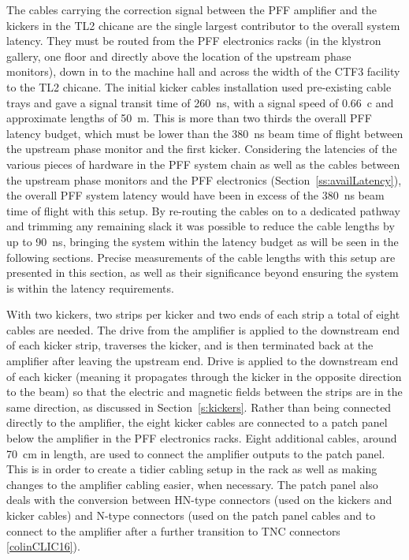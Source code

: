 The cables carrying the correction signal between the PFF amplifier and the kickers in the TL2 chicane are the single largest contributor to the overall system latency. They must be routed from the PFF electronics racks (in the klystron gallery, one floor and directly above the location of the upstream phase monitors), down in to the machine hall and across the width of the CTF3 facility to the TL2 chicane. The initial kicker cables installation used pre-existing cable trays and gave a signal transit time of 260~ns, with a signal speed of 0.66~c and approximate lengths of 50~m. This is more than two thirds the overall PFF latency budget, which must be lower than the 380~ns beam time of flight between the upstream phase monitor and the first kicker. Considering the latencies of the various pieces of hardware in the PFF system chain as well as the cables between the upstream phase monitors and the PFF electronics (Section~\ref{ss:availLatency}), the overall PFF system latency would have been in excess of the \(380\)~ns beam time of flight with this setup. By re-routing the cables on to a dedicated pathway and trimming any remaining slack it was possible to reduce the cable lengths by up to 90~ns, bringing the system within the latency budget as will be seen in the following sections. Precise measurements of the cable lengths with this setup are presented in this section, as well as their significance beyond ensuring the system is within the latency requirements.

With two kickers, two strips per kicker and two ends of each strip a total of eight cables are needed. The drive from the amplifier is applied to the downstream end of each kicker strip, traverses the kicker, and is then terminated back at the amplifier after leaving the upstream end. Drive is applied to the downstream end of each kicker (meaning it propagates through the kicker in the opposite direction to the beam) so that the electric and magnetic fields between the strips are in the same direction, as discussed in Section~\ref{s:kickers}. Rather than being connected directly to the amplifier, the eight kicker cables are connected to a patch panel below the amplifier in the PFF electronics racks. Eight additional cables, around 70~cm in length, are used to connect the amplifier outputs to the patch panel. This is in order to create a tidier cabling setup in the rack as well as making changes to the amplifier cabling easier, when necessary. The patch panel also deals with the conversion between HN-type connectors (used on the kickers and kicker cables) and N-type connectors (used on the patch panel cables and to connect to the amplifier after a further transition to TNC connectors \ref{colinCLIC16}).

